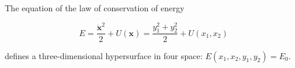 The equation of the law of conservation of energy

$$E = \frac{\dot{\mathbf{x}}^2}{2} + U(\mathbf{x}) = \frac{y_1^2 + y_2^2}{2} + U(x_1, x_2)$$

defines a three-dimensional hypersurface in four space: $E(x_1, x_2, y_1, y_2) = E_0$.
